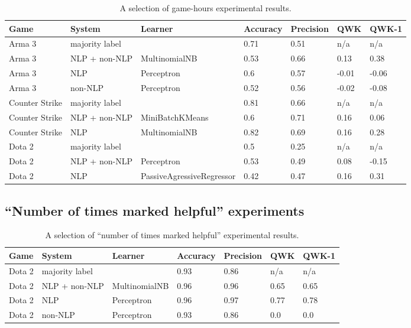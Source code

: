\documentclass[9pt]{article}
\begin{document}
\begin{table*}[t]
\centering
\begin{tabular}{*{7}{l}}
\hline \bf Game & \bf System & \bf Learner & \bf Accuracy & \bf Precision & \bf QWK & \bf QWK-1 \\ \hline
Arma 3 & majority label &  & 0.71 & 0.51 & n/a & n/a \\
Arma 3 & NLP + non-NLP & MultinomialNB & 0.53 & 0.66 & 0.13 & 0.38 \\
Arma 3 & NLP & Perceptron & 0.6 & 0.57 & -0.01 & -0.06 \\
Arma 3 & non-NLP & Perceptron & 0.52 & 0.56 & -0.02 & -0.08 \\
Counter Strike & majority label &  & 0.81 & 0.66 & n/a & n/a \\
Counter Strike & NLP + non-NLP & MiniBatchKMeans & 0.6 & 0.71 & 0.16 & 0.06 \\
Counter Strike & NLP & MultinomialNB & 0.82 & 0.69 & 0.16 & 0.28 \\
Dota 2 & majority label &  & 0.5 & 0.25 & n/a & n/a \\
Dota 2 & NLP + non-NLP & Perceptron & 0.53 & 0.49 & 0.08 & -0.15 \\
Dota 2 & NLP & PassiveAgressiveRegressor & 0.42 & 0.47 & 0.16 & 0.31 \\ \hline
\end{tabular}
\caption{A selection of game-hours experimental results.}
\label{tab:hours_experiment_results}
\end{table*}
\lipsum[1-7]

\subsection{``Number of times marked helpful'' experiments}
\label{ssec:helpful}

\begin{table*}[t]
\centering
\begin{tabular}{*{7}{l}}
\hline \bf Game & \bf System & \bf Learner & \bf Accuracy & \bf Precision & \bf QWK & \b QWK-1 \\ \hline
Dota 2 & majority label &  & 0.93 & 0.86 & n/a & n/a \\
Dota 2 & NLP + non-NLP & MultinomialNB & 0.96 & 0.96 & 0.65 & 0.65 \\
Dota 2 & NLP & Perceptron & 0.96 & 0.97 & 0.77 & 0.78 \\
Dota 2 & non-NLP & Perceptron & 0.93 & 0.86 & 0.0 & 0.0 \\ \hline
\end{tabular}
\caption{A selection of ``number of times marked helpful'' experimental results.}
\label{tab:hours_experiment_results}
\end{table*}
\lipsum[1-7]
\end{document}
